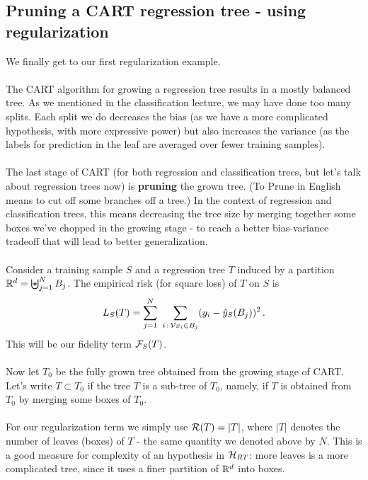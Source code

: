     \subsection{Pruning a CART regression tree - using regularization}

    We finally get to our first regularization example. 
\\~\\
    The CART algorithm for growing a regression tree results in a mostly balanced
    tree. As we mentioned in the classification lecture, we may have done too
    many splits. Each split we do decreases the bias (as we have a more
    complicated hypothesis, with more expressive power) but also increases the
    variance (as the labels for prediction in the leaf are averaged over fewer
    training samples).
\\~\\
    The last stage of CART (for both regression and classification trees, but
    let's talk about regression trees now) is  {\bf pruning} the grown tree.
    (To Prune in English means to cut off some branches off a tree.)
    In the context of regression and classification trees, this
    means decreasing the tree size by merging together some boxes
    we've chopped in the growing stage - to reach a better bias-variance
    tradeoff that will lead to better generalization. 
    \\~\\
    Consider a training
    sample $S$ and a  regression tree
    $T$ induced by a
    partition $\mathbb{R}^d=\biguplus_{j=1}^N B_j$. 
%
The empirical risk (for
    square loss) of $T$ on $S$ is 
    \[
      L_S(T) = \sum_{j=1}^N \,\,\sum_{i\,:\, \mathcal{V}{x}_i\in B_j}
      (y_i-\hat{y}_S(B_j))^2\,.
    \]
    This will be our fidelity term $\mathcal{F}_S(T)$.
    \\~\\
    Now let $T_0$ be the fully grown tree obtained from the growing stage of
    CART. 
    Let's write $T\subset T_0$ if the tree $T$ is a sub-tree of $T_0$, namely,
    if $T$ is obtained from $T_0$ by merging some boxes of $T_0$.
\\~\\
For our regularization term we simply use $\mathcal{R}(T)=|T|$, where $|T|$ denotes the
number of leaves (boxes) of $T$ - the same quantity we denoted above by $N$.
This is a good
    measure for complexity of an hypothesis in $\mathcal{H}_{RT}$: more leaves is 
    a more complicated tree, since it uses
    a finer partition of $\mathbb{R}^d$ into boxes.
\\~\\
